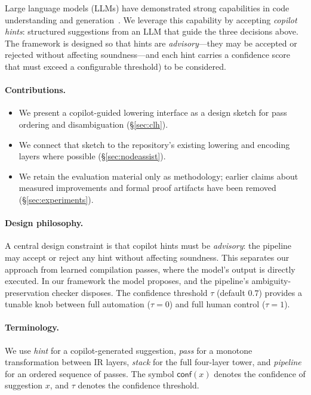 \documentclass[11pt]{article}
\newcommand{\conf}{\mathsf{conf}}
\begin{document}
Large language models (LLMs) have demonstrated strong capabilities in
code understanding and generation~\cite{chen2021codex,li2023starcoder}.
We leverage this capability by accepting \emph{copilot hints}:
structured suggestions from an LLM that guide the three decisions above.
The framework is designed so that hints are \emph{advisory}---they may
be accepted or rejected without affecting soundness---and each hint
carries a confidence score that must exceed a configurable threshold) to be considered.

\paragraph{Contributions.}
\begin{itemize}
\item We present a copilot-guided lowering interface as a design sketch
  for pass ordering and disambiguation (\S\ref{sec:clh}).
\item We connect that sketch to the repository's existing lowering and
  encoding layers where possible (\S\ref{sec:nodeassist}).
\item We retain the evaluation material only as methodology; earlier
  claims about measured improvements and formal proof artifacts have
  been removed (\S\ref{sec:experiments}).
\end{itemize}

\paragraph{Design philosophy.}
A central design constraint is that copilot hints must be
\emph{advisory}: the pipeline may accept or reject any hint without
affecting soundness.  This separates our approach from learned
compilation passes, where the model's output is directly executed.  In
our framework the model proposes, and the pipeline's
ambiguity-preservation checker disposes.  The confidence threshold
$\tau$ (default $0.7$) provides a tunable knob
between full automation ($\tau = 0$) and full human control
($\tau = 1$).

\paragraph{Terminology.}
We use \emph{hint} for a copilot-generated suggestion,
\emph{pass} for a monotone transformation between IR layers,
\emph{stack} for the full four-layer tower, and
\emph{pipeline} for an ordered sequence of passes.  The symbol
$\conf(x)$ denotes the confidence of suggestion $x$, and $\tau$
denotes the confidence threshold.
\end{document}
